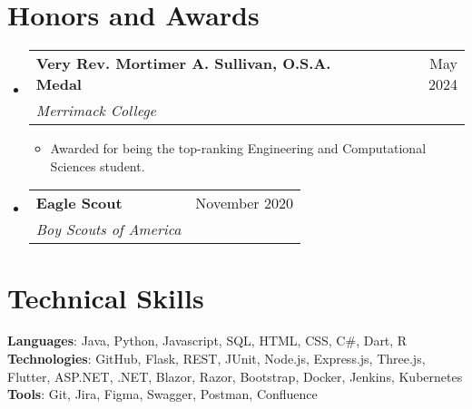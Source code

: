 \documentclass[letterpaper,11pt]{article}
\makeatletter
\newcommand{\resumeItem}[1]{
  \item\small{
    {#1 \vspace{-2pt}}
  }
}
\newcommand{\resumeSubheading}[4]{
  \vspace{-2pt}\item
    \begin{tabular*}{0.97\textwidth}[t]{l@{\extracolsep{\fill}}r}
      \textbf{#1} & #2 \\
      \textit{\small#3} & \textit{\small #4} \\
    \end{tabular*}\vspace{-7pt}
}
\newcommand{\resumeProjectHeading}[2]{
    \item
    \begin{tabular*}{0.97\textwidth}{l@{\extracolsep{\fill}}r}
      \small#1 & #2 \\
    \end{tabular*}\vspace{-7pt}
}
\newcommand{\resumeSubHeadingListStart}{\begin{itemize}[leftmargin=0.15in, label={}]}
\newcommand{\resumeSubHeadingListEnd}{\end{itemize}}
\newcommand{\resumeItemListStart}{\begin{itemize}}
\newcommand{\resumeItemListEnd}{\end{itemize}\vspace{-5pt}}
\makeatother
\begin{document}


\section{Honors and Awards}
\resumeSubHeadingListStart
    \resumeSubheading
      {Very Rev. Mortimer A. Sullivan, O.S.A. Medal}{May 2024}
      {Merrimack College}{}
      \resumeItemListStart
        \resumeItem{Awarded for being the top-ranking Engineering and Computational Sciences student.}
      \resumeItemListEnd

      \resumeSubheading
      {Eagle Scout}{November 2020}
      {Boy Scouts of America}{}
    \resumeSubHeadingListEnd


\section{Technical Skills}
 \begin{itemize}[leftmargin=0.15in, label={}]
    \small{\item{
     \textbf{Languages}{: Java, Python, Javascript, SQL, HTML, CSS, C\#, Dart, R} \\
     \textbf{Technologies}{: GitHub, Flask, REST, JUnit, Node.js, Express.js, Three.js, Flutter, ASP.NET, .NET, Blazor, Razor, Bootstrap, Docker, Jenkins, Kubernetes} \\
     \textbf{Tools}{: Git, Jira, Figma, Swagger, Postman, Confluence}
    }}
 \end{itemize}
 
\end{document}
